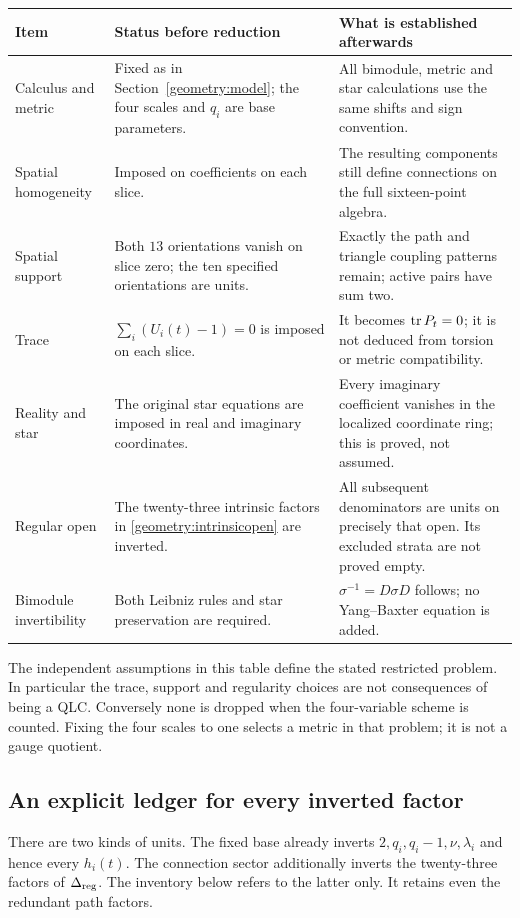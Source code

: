 \documentclass[11pt,a4paper]{article}
\theoremstyle{remark}\newtheorem{remark}[theorem]{Remark}
\begin{document}
\begin{center}\small
\begin{tabular}{p{.23\linewidth}p{.32\linewidth}p{.36\linewidth}}
\hline
Item&Status before reduction&What is established afterwards\\\hline
Calculus and metric&Fixed as in Section~\ref{geometry:model}; the four
scales and $q_i$ are base parameters.&All bimodule, metric and star
calculations use the same shifts and sign convention.\\
Spatial homogeneity&Imposed on coefficients on each slice.&The resulting
components still define connections on the full sixteen-point algebra.\\
Spatial support&Both $13$ orientations vanish on slice zero; the ten
specified orientations are units.&Exactly the path and triangle
coupling patterns remain; active pairs have sum two.\\
Trace&$\sum_i(U_i(t)-1)=0$ is imposed on each slice.&It becomes
$\operatorname{tr} P_t=0$; it is not deduced from torsion or metric compatibility.\\
Reality and star&The original star equations are imposed in real and
imaginary coordinates.&Every imaginary coefficient vanishes in the
localized coordinate ring; this is proved, not assumed.\\
Regular open&The twenty-three intrinsic factors in
\eqref{geometry:intrinsicopen} are inverted.&All subsequent denominators
are units on precisely that open. Its excluded strata are not proved empty.\\
Bimodule invertibility&Both Leibniz rules and star preservation are required.&
$\sigma^{-1}=D\sigma D$ follows; no Yang--Baxter equation is added.\\\hline
\end{tabular}
\end{center}

The independent assumptions in this table define the stated restricted
problem. In particular the trace, support and regularity choices are
not consequences of being a QLC. Conversely none is dropped when
the four-variable scheme is counted. Fixing the four scales to one
selects a metric in that problem; it is not a gauge quotient.

\subsection{An explicit ledger for every inverted factor}
\label{integrity:units}

There are two kinds of units. The fixed base already inverts
$2,q_i,q_i-1,\nu,\lambda_i$ and hence every $h_i(t)$.
The connection sector additionally inverts the twenty-three factors
of $\Delta_{\rm reg}$. The inventory below refers to the latter only.
It retains even the redundant path factors.
\end{document}
